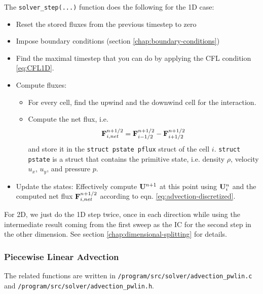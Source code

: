 The \verb|solver_step(...)| function does the following for the 1D case:
\begin{itemize}
	\item 	Reset the stored fluxes from the previous timestep to zero
	\item 	Impose boundary conditions (section \ref{chap:boundary-conditions})
	\item 	Find the maximal timestep that you can do by applying the CFL condition \ref{eq:CFL1D}.
	\item 	Compute fluxes:
	\begin{itemize}
		\item 	For every cell, find the upwind and the downwind cell for the interaction.
		\item 	Compute the net flux, i.e.
				\begin{equation}
				\mathbf{F}_{i, net}^{n+1/2} = \mathbf{F}_{i-1/2}^{n+1/2} - \mathbf{F}_{i+1/2}^{n+1/2}
				\end{equation}
				and store it in the \texttt{struct pstate pflux} struct of the cell $i$.
				\texttt{struct pstate} is a struct that contains the primitive state, i.e. density $\rho$, velocity $u_x$, $u_y$, and pressure $p$.
	\end{itemize}
	\item 	Update the states: Effectively compute $\mathbf{U}^{n+1}$ at this point using $\mathbf{U}_i^n$ and the computed net flux $\mathbf{F}_{i, net}^{n+1/2}$ according to eqn. \ref{eq:advection-discretized}.
\end{itemize}



For 2D, we just do the 1D step twice, once in each direction while using the intermediate result coming from the first sweep as the IC for the second step in the other dimension.
See section \ref{chap:dimensional-splitting} for details.









\subsubsection{Piecewise Linear Advection}

The related functions are written in \verb|/program/src/solver/advection_pwlin.c| and \verb|/program/src/solver/advection_pwlin.h|.


